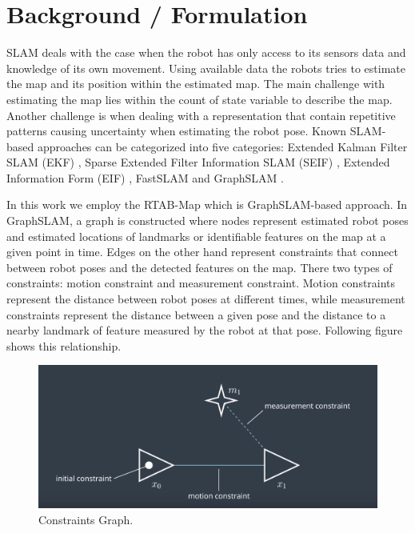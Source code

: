\documentclass[10pt,journal,compsoc]{IEEEtran}
\begin{document}
\section{Background / Formulation}


SLAM deals with the case when the robot has only access to its sensors data and knowledge of its own movement. Using available data the robots tries to estimate the map and its position within the estimated map. The main challenge with estimating the map lies within the count of state variable to describe the map. Another challenge is when dealing with a representation that contain repetitive patterns causing uncertainty when estimating the robot pose. Known SLAM-based approaches can be categorized into five categories: Extended Kalman Filter SLAM (EKF) \cite{ekf-slam-wiki}, Sparse Extended Filter Information SLAM (SEIF) \cite{seif}, Extended Information Form (EIF) \cite{maybeck1982stochastic}, FastSLAM \cite{Montemerlo02fastslam:a} and GraphSLAM \cite{thrun2006graph}.

In this work we employ the RTAB-Map which is GraphSLAM-based approach. In GraphSLAM, a graph is constructed where nodes represent estimated robot poses and estimated locations of landmarks or identifiable features on the map at a given point in time. Edges on the other hand represent constraints that connect between robot poses and the detected features on the map. There two types of constraints: motion constraint and measurement constraint. Motion constraints represent the distance between robot poses at different times, while measurement constraints represent the distance between a given pose and the distance to a nearby landmark of feature measured by the robot at that pose. Following figure shows this relationship.

\begin{figure}[thpb]
      \centering
      \includegraphics[width=\linewidth]{graph.png}
      \caption{Constraints Graph.}
      \label{fig:graph-slam}
\end{figure}
\end{document}
